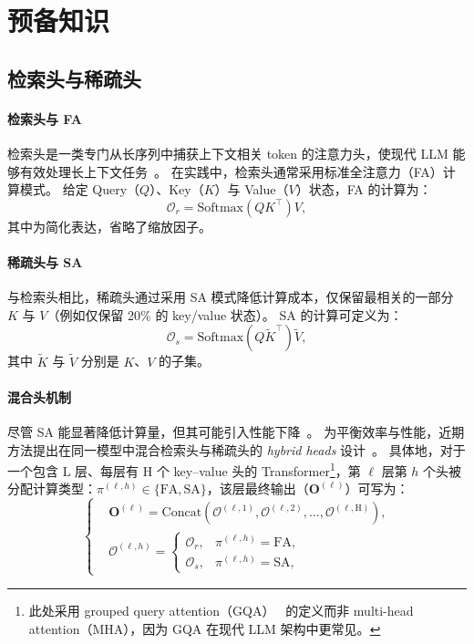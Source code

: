 \section{预备知识}
\label{sec:preliminary}


\subsection{检索头与稀疏头}
\label{subsec:attn_mechanism}

\paragraph{检索头与 FA}
检索头是一类专门从长序列中捕获上下文相关 token 的注意力头，使现代 LLM 能够有效处理长上下文任务~\citep{wu2024retrieval}。
在实践中，检索头通常采用标准全注意力（FA）计算模式。
给定 Query（$Q$）、Key（$K$）与 Value（$V$）状态，FA 的计算为：
\begin{equation}
\mathcal{O}_{r}=\mathrm{Softmax}\!\left(QK^{\top}\right)V,
\label{equ:dot_attention}
\end{equation}
其中为简化表达，省略了缩放因子。

\paragraph{稀疏头与 SA}
与检索头相比，稀疏头通过采用 SA 模式降低计算成本，仅保留最相关的一部分 $K$ 与 $V$（例如仅保留 20\% 的 key/value 状态）。
SA 的计算可定义为：
\begin{equation}
\mathcal{O}_{s}=\mathrm{Softmax}\!\left(Q\tilde{K}^{\top}\right)\tilde{V},
\label{equ:sparse_attention}
\end{equation}
其中 $\tilde{K}$ 与 $\tilde{V}$ 分别是 $K$、$V$ 的子集。

\paragraph{混合头机制}
尽管 SA 能显著降低计算量，但其可能引入性能下降~\citep{lu2025moba}。
为平衡效率与性能，近期方法提出在同一模型中混合检索头与稀疏头的 \emph{hybrid heads} 设计~\citep{xiaoduoattention2025,yu2025sliding,bhaskar2025cache}。
具体地，对于一个包含 $\mathrm{L}$ 层、每层有 $\mathrm{H}$ 个 key--value 头的 Transformer\footnote{此处采用 grouped query attention（GQA）~\citep{ainslie2023gqa} 的定义而非 multi-head attention（MHA），因为 GQA 在现代 LLM 架构中更常见。}，第 $\ell$ 层第 $h$ 个头被分配计算类型：$\pi^{(\ell, h)} \in \{\text{FA}, \text{SA}\}$，该层最终输出（$\mathbf{O}^{(\ell)}$）可写为：
\begin{equation}
\left\{
\begin{aligned}
& \mathbf{O}^{(\ell)} =
\mathrm{Concat}\!\left(
\mathcal{O}^{(\ell,1)},
\mathcal{O}^{(\ell,2)},
\dots,
\mathcal{O}^{(\ell,\mathrm{H})}
\right),\\
& \mathcal{O}^{(\ell,h)} =
\begin{cases}
\mathcal{O}_{r}, & \pi^{(\ell, h)}=\text{FA},\\
\mathcal{O}_{s}, & \pi^{(\ell, h)}=\text{SA},
\end{cases}
\end{aligned}
\right.
\label{equ:hybrid_concat}
\end{equation}


